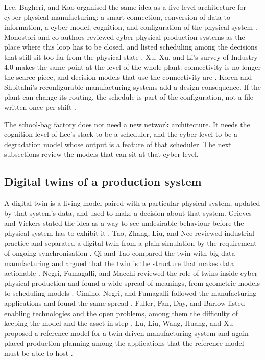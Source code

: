 Lee, Bagheri, and Kao organised the same idea as a five-level architecture for cyber-physical manufacturing: a smart connection, conversion of data to information, a cyber model, cognition, and configuration of the physical system \cite{lee2015}. Monostori and co-authors reviewed cyber-physical production systems as the place where this loop has to be closed, and listed scheduling among the decisions that still sit too far from the physical state \cite{monostori2016}. Xu, Xu, and Li's survey of Industry 4.0 makes the same point at the level of the whole plant: connectivity is no longer the scarce piece, and decision models that use the connectivity are \cite{xu2018}. Koren and Shpitalni's reconfigurable manufacturing systems add a design consequence. If the plant can change its routing, the schedule is part of the configuration, not a file written once per shift \cite{koren2010}.

The school-bag factory does not need a new network architecture. It needs the cognition level of Lee's stack to be a scheduler, and the cyber level to be a degradation model whose output is a feature of that scheduler. The next subsections review the models that can sit at that cyber level.

\subsection{Digital twins of a production system}

A digital twin is a living model paired with a particular physical system, updated by that system's data, and used to make a decision about that system. Grieves and Vickers stated the idea as a way to see undesirable behaviour before the physical system has to exhibit it \cite{grieves2017}. Tao, Zhang, Liu, and Nee reviewed industrial practice and separated a digital twin from a plain simulation by the requirement of ongoing synchronisation \cite{tao2019}. Qi and Tao compared the twin with big-data manufacturing and argued that the twin is the structure that makes data actionable \cite{qi2018}. Negri, Fumagalli, and Macchi reviewed the role of twins inside cyber-physical production and found a wide spread of meanings, from geometric models to scheduling models \cite{negri2017}. Cimino, Negri, and Fumagalli followed the manufacturing applications and found the same spread \cite{cimino2019}. Fuller, Fan, Day, and Barlow listed enabling technologies and the open problems, among them the difficulty of keeping the model and the asset in step \cite{fuller2020}. Lu, Liu, Wang, Huang, and Xu proposed a reference model for a twin-driven manufacturing system and again placed production planning among the applications that the reference model must be able to host \cite{lu2020}.

